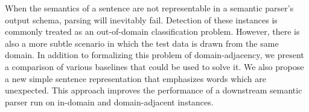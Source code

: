 When the semantics of a sentence are not representable in a semantic parser's output schema, parsing will inevitably fail. Detection of these instances is commonly treated as an out-of-domain classification problem. However, there is also a more subtle scenario in which the test data is drawn from the same domain. In addition to formalizing this problem of domain-adjacency, we present a comparison of various baselines that could be used to solve it. We also propose a new simple sentence representation that emphasizes words which are unexpected. This approach improves the performance of a downstream semantic parser run on in-domain and domain-adjacent instances.
